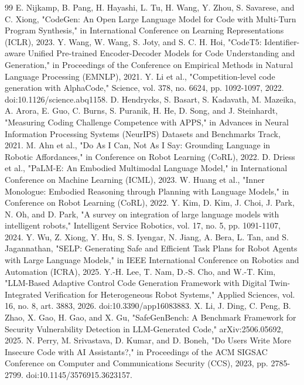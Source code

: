 \documentclass{ieeeaccess}
\begin{document}
\begin{thebibliography}{99}
 E. Nijkamp, B. Pang, H. Hayashi, L. Tu, H. Wang, Y. Zhou, S. Savarese, and C. Xiong, "CodeGen: An Open Large Language Model for Code with Multi-Turn Program Synthesis," in International Conference on Learning Representations (ICLR), 2023.
 Y. Wang, W. Wang, S. Joty, and S. C. H. Hoi, "CodeT5: Identifier-aware Unified Pre-trained Encoder-Decoder Models for Code Understanding and Generation," in Proceedings of the Conference on Empirical Methods in Natural Language Processing (EMNLP), 2021.
 Y. Li et al., "Competition-level code generation with AlphaCode," Science, vol. 378, no. 6624, pp. 1092-1097, 2022. doi:10.1126/science.abq1158.
 D. Hendrycks, S. Basart, S. Kadavath, M. Mazeika, A. Arora, E. Guo, C. Burns, S. Puranik, H. He, D. Song, and J. Steinhardt, "Measuring Coding Challenge Competence with APPS," in Advances in Neural Information Processing Systems (NeurIPS) Datasets and Benchmarks Track, 2021.
 M. Ahn et al., "Do As I Can, Not As I Say: Grounding Language in Robotic Affordances," in Conference on Robot Learning (CoRL), 2022.
 D. Driess et al., "PaLM-E: An Embodied Multimodal Language Model," in International Conference on Machine Learning (ICML), 2023.
 W. Huang et al., "Inner Monologue: Embodied Reasoning through Planning with Language Models," in Conference on Robot Learning (CoRL), 2022.
 Y. Kim, D. Kim, J. Choi, J. Park, N. Oh, and D. Park, "A survey on integration of large language models with intelligent robots," Intelligent Service Robotics, vol. 17, no. 5, pp. 1091-1107, 2024.
 Y. Wu, Z. Xiong, Y. Hu, S. S. Iyengar, N. Jiang, A. Bera, L. Tan, and S. Jagannathan, "SELP: Generating Safe and Efficient Task Plans for Robot Agents with Large Language Models," in IEEE International Conference on Robotics and Automation (ICRA), 2025.
 Y.-H. Lee, T. Nam, D.-S. Cho, and W.-T. Kim, "LLM-Based Adaptive Control Code Generation Framework with Digital Twin-Integrated Verification for Heterogeneous Robot Systems," Applied Sciences, vol. 16, no. 8, art. 3883, 2026. doi:10.3390/app16083883.
 X. Li, J. Ding, C. Peng, B. Zhao, X. Gao, H. Gao, and X. Gu, "SafeGenBench: A Benchmark Framework for Security Vulnerability Detection in LLM-Generated Code," arXiv:2506.05692, 2025.
 N. Perry, M. Srivastava, D. Kumar, and D. Boneh, "Do Users Write More Insecure Code with AI Assistants?," in Proceedings of the ACM SIGSAC Conference on Computer and Communications Security (CCS), 2023, pp. 2785-2799. doi:10.1145/3576915.3623157.

\end{thebibliography}
\end{document}

